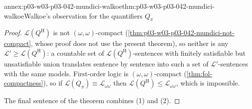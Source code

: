 \begin{annexitem}{annex:p03-w03-p03-042-mundici-walkoe}{thm:p03-w03-p03-042-mundici-walkoe}{Walkoe's observation for the quantifiers \(Q_\pi\)}
\begin{proof}
\(\mathscr L(Q^{\mathrm H})\) is not \((\omega,\omega)\)-compact
(\cref{thm:p03-w03-p03-042-mundici-not-compact}, whose proof does not use
the present theorem), so neither is any \(\mathscr L'\geq\mathscr
L(Q^{\mathrm H})\): a countable set of \(\mathscr L(Q^{\mathrm
H})\)-sentences with finitely satisfiable but unsatisfiable union
translates sentence by sentence into such a set of \(\mathscr
L'\)-sentences with the same models.  First-order logic is
\((\omega,\omega)\)-compact (\cref{thm:fol-compactness}), so if
\(\mathscr L(Q_\pi)\equiv\mathscr L_{\omega\omega}\) then \(\mathscr
L(Q^{\mathrm H})\leq\mathscr L_{\omega\omega}\), which is impossible.

The final sentence of the theorem combines (1) and (2).
\end{proof}
\end{annexitem}

